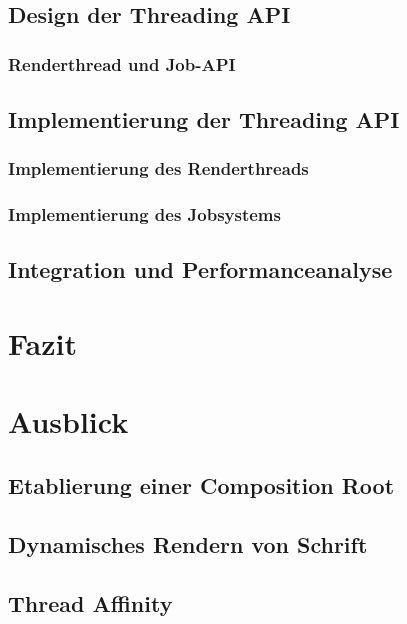 \documentclass[12pt,a4paper,listof=totocnumbered,parskip=half]{scrreprt}
\begin{document}
\section{Design der Threading API}

\subsection{Renderthread und Job-API}


\section{Implementierung der Threading API}

\subsection{Implementierung des Renderthreads}



\subsection{Implementierung des Jobsystems}

\section{Integration und Performanceanalyse}

\chapter{Fazit}
\chapter{Ausblick}
\section{Etablierung einer Composition Root}

\section{Dynamisches Rendern von Schrift}
\section{Thread Affinity}
\end{document}
